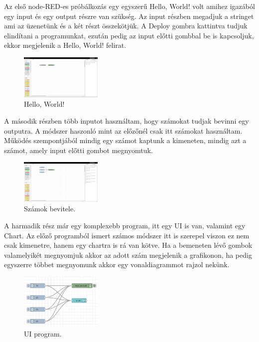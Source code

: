 \documentclass[a4paper,12pt,oneside]{report}
\begin{document}
Az első node-RED-es próbálkozás egy egyszerű Hello, World! volt amihez igazából egy input és egy output részre van szükség.
Az input részben megadjuk a stringet ami az üzenetünk és a két részt összekötjük. A Deploy gombra kattintva tudjuk elindítani a
programunkat, ezután pedig az input előtti gombbal be is kapcsoljuk, ekkor megjelenik a Hello, World! felirat.

\begin{figure}[htbp]
	\centering
	\includegraphics[width=0.35\textwidth]{fig/Hello, World.png}
	\caption{Hello, World!}
	\label{fig-Hello, World}
\end{figure}

A második részben több inputot használtam, hogy számokat tudjak bevinni egy outputra. A módszer haszonló mint az előzőnél
csak itt számokat használtam. Működés szempontjából mindig egy számot kaptunk a kimeneten, mindig azt a számot, amely input előtti
gombot megnyomtuk.

\begin{figure}[htbp]
	\centering
	\includegraphics[width=0.35\textwidth]{fig/Numbers.png}
	\caption{Számok bevitele.}
	\label{fig-Numbers}
\end{figure}

A harmadik rész már egy komplexebb program, itt egy UI is van, valamint egy Chart. Az előző programból ismert számos módszer
itt is szerepel viszon ez nem csak kimenetre, hanem egy chartra is rá van kötve. Ha a bemeneten lévő gombok valamelyikét megnyomjuk 
akkor az adott szám megjelenik a grafikonon, ha pedig egyszerre többet megnyomunk akkor egy vonaldiagrammot rajzol nekünk.

\begin{figure}[htbp]
	\centering
	\includegraphics[width=0.35\textwidth]{fig/uichart.png}
	\caption{UI program.}
	\label{fig-uichart}
\end{figure}
\end{document}
